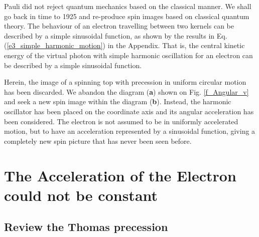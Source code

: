 \documentclass[%
 reprint,
 amsmath,amssymb,
 aps,
]{revtex4-1}
\numberwithin{equation}{section}%
\begin{document}






Pauli did not reject quantum mechanics based on the classical manner. We shall go back in time to 1925 and re-produce spin images based on classical quantum theory. The behaviour of an electron travelling between two kernels can be described by a simple sinusoidal function, as shown by the results in Eq. (\ref{e3_simple_harmonic_motion}) in the Appendix. That is, the central kinetic energy of the virtual photon with simple harmonic oscillation for an electron can be described by a simple sinusoidal function.

Herein, the image of a spinning top with precession in uniform circular motion has been discarded. We abandon the diagram ({\bf a}) shown on Fig. \ref{f_Angular_v} and seek a new spin image within the diagram ({\bf b}). Instead, the harmonic oscillator has been placed on the coordinate axis and its angular acceleration has been considered. The electron is not assumed to be in uniformly accelerated motion, but to have an acceleration represented by a sinusoidal function, giving a completely new spin picture that has never been seen before.


\section{The Acceleration of the Electron could not be constant}

\subsection{Review the Thomas precession}

\end{document}
